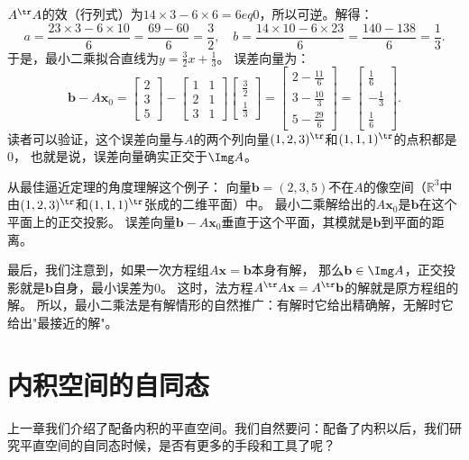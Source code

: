 \documentclass[12pt,UTF8,fontset=none]{ctexbook}
\begin{document}
$A^{\tr} A$的效（行列式）为$14 \times 3 - 6 \times 6 = 6 
eq 0$，所以可逆。解得：
$$ a = \frac{23 \times 3 - 6 \times 10}{6} = \frac{69 - 60}{6} = \frac{3}{2}, \quad b = \frac{14 \times 10 - 6 \times 23}{6} = \frac{140 - 138}{6} = \frac{1}{3}. $$
于是，最小二乘拟合直线为$y = \frac{3}{2}x + \frac{1}{3}$。
误差向量为：
$$ \mathbf{b} - A\mathbf{x}_0 = \begin{bmatrix} 2 \\ 3 \\ 5 \end{bmatrix} - \begin{bmatrix} 1 & 1 \\ 2 & 1 \\ 3 & 1 \end{bmatrix} \begin{bmatrix} \frac{3}{2} \\[2pt] \frac{1}{3} \end{bmatrix} = \begin{bmatrix} 2 - \frac{11}{6} \\[2pt] 3 - \frac{10}{3} \\[2pt] 5 - \frac{29}{6} \end{bmatrix} = \begin{bmatrix} \frac{1}{6} \\[2pt] -\frac{1}{3} \\[2pt] \frac{1}{6} \end{bmatrix}. $$
读者可以验证，这个误差向量与$A$的两个列向量$(1,2,3)^{\tr}$和$(1,1,1)^{\tr}$的点积都是$0$，
也就是说，误差向量确实正交于$\Img A$。

从最佳逼近定理的角度理解这个例子：
向量$\mathbf{b} = (2, 3, 5)$不在$A$的像空间（$\mathbb{R}^3$中由$(1,2,3)^{\tr}$和$(1,1,1)^{\tr}$张成的二维平面）中。
最小二乘解给出的$A\mathbf{x}_0$是$\mathbf{b}$在这个平面上的正交投影。
误差向量$\mathbf{b} - A\mathbf{x}_0$垂直于这个平面，其模就是$\mathbf{b}$到平面的距离。

最后，我们注意到，如果一次方程组$A\mathbf{x} = \mathbf{b}$本身有解，
那么$\mathbf{b} \in \Img A$，正交投影就是$\mathbf{b}$自身，最小误差为$0$。
这时，法方程$A^{\tr} A \mathbf{x} = A^{\tr} \mathbf{b}$的解就是原方程组的解。
所以，最小二乘法是有解情形的自然推广：有解时它给出精确解，无解时它给出"最接近的解"。


\chapter{内积空间的自同态}
上一章我们介绍了配备内积的平直空间。我们自然要问：配备了内积以后，我们研究平直空间的自同态时候，是否有更多的手段和工具了呢？
\end{document}
